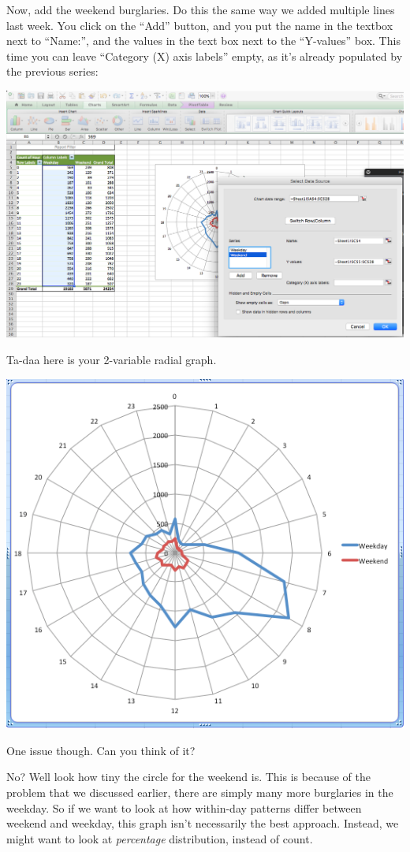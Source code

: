 \documentclass[]{book}
\theoremstyle{definition}
\theoremstyle{definition}
\theoremstyle{definition}
\theoremstyle{remark}
\begin{document}
Now, add the weekend burglaries. Do this the same way we added multiple
lines last week. You click on the ``Add'' button, and you put the name
in the textbox next to ``Name:'', and the values in the text box next to
the ``Y-values'' box. This time you can leave ``Category (X) axis
labels'' empty, as it's already populated by the previous series:

\includegraphics{imgs/hr_r_24.png}

Ta-daa here is your 2-variable radial graph.

\includegraphics{imgs/hr_r_25.png}

One issue though. Can you think of it?

No? Well look how tiny the circle for the weekend is. This is because of
the problem that we discussed earlier, there are simply many more
burglaries in the weekday. So if we want to look at how within-day
patterns differ between weekend and weekday, this graph isn't
necessarily the best approach. Instead, we might want to look at
\emph{percentage} distribution, instead of count.
\end{document}
